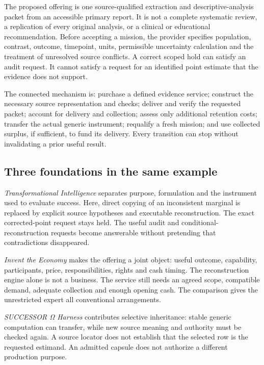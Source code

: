 The proposed offering is one source-qualified extraction and descriptive-analysis packet from an accessible primary report. It is not a complete systematic review, a replication of every original analysis, or a clinical or educational recommendation. Before accepting a mission, the provider specifies population, contrast, outcome, timepoint, units, permissible uncertainty calculation and the treatment of unresolved source conflicts. A correct scoped hold can satisfy an audit request. It cannot satisfy a request for an identified point estimate that the evidence does not support.

The connected mechanism is: purchase a defined evidence service; construct the necessary source representation and checks; deliver and verify the requested packet; account for delivery and collection; assess only additional retention costs; transfer the actual generic instrument; requalify a fresh mission; and use collected surplus, if sufficient, to fund its delivery. Every transition can stop without invalidating a prior useful result.

\subsection{Three foundations in the same example}

\emph{Transformational Intelligence} separates purpose, formulation and the instrument used to evaluate success. Here, direct copying of an inconsistent marginal is replaced by explicit source hypotheses and executable reconstruction. The exact corrected-point request stays held. The useful audit and conditional-reconstruction requests become answerable without pretending that contradictions disappeared.\citep{ti}

\emph{Invent the Economy} makes the offering a joint object: useful outcome, capability, participants, price, responsibilities, rights and cash timing. The reconstruction engine alone is not a business. The service still needs an agreed scope, compatible demand, adequate collection and enough opening cash. The comparison gives the unrestricted expert all conventional arrangements.\citep{economy}

\emph{SUCCESSOR Ω Harness} contributes selective inheritance: stable generic computation can transfer, while new source meaning and authority must be checked again. A source locator does not establish that the selected row is the requested estimand. An admitted capsule does not authorize a different production purpose.\citep{harness}

